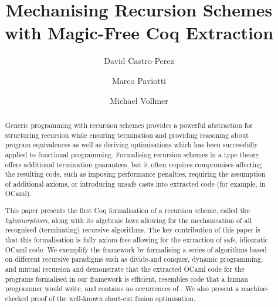 \documentclass[ a4paper, UKenglish, cleveref, autoref, thm-restate]{lipics-v2021}
\title{Mechanising Recursion Schemes with Magic-Free Coq Extraction}
\author{David Castro-Perez}{School of Computing, University of Kent}{d-castro-perez@kent.ac.uk}{}{}
\author{Marco Paviotti}{School of Computing, University of Kent}{m.paviotti@kent.ac.uk}{}{}
\author{Michael Vollmer}{School of Computing, University of Kent}{m.vollmer@kent.ac.uk}{}{}
\begin{document}
\maketitle

\begin{abstract}
  Generic programming with recursion schemes provides a powerful abstraction for
structuring recursion while ensuring termination and providing reasoning about
program equivalences as well as deriving optimisations which has been
successfully applied to functional programming. Formalising recursion schemes in
a type theory offers additional termination guarantees, but it often requires
compromises affecting the resulting code, such as imposing performance
penalties, requiring the assumption of additional axioms, or introducing unsafe
casts into extracted code (for example,  in OCaml).

This paper presents the first Coq formalisation of a recursion scheme, called
the \emph{hylomorphism}, along with its algebraic laws allowing for the
mechanisation of all recognised (terminating) recursive algorithms. The key
contribution of this paper is that this formalisation is fully axiom-free
allowing for the extraction of safe, idiomatic OCaml code. We exemplify the
framework by formalising a series of algorithms based on different recursive paradigms such as divide-and conquer, dynamic programming,
and mutual recursion and demonstrate that the extracted OCaml code for
the programs formalised in our framework is efficient, resembles code that a
human programmer would write, and contains no occurrences of .
We also present a machine-checked proof of the well-known short-cut fusion
optimisation.
\end{abstract}
\end{document}
